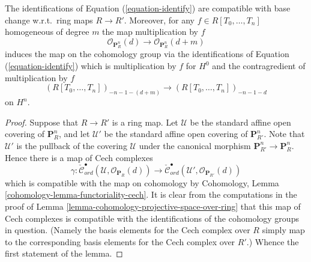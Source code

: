 \begin{lemma}
\label{lemma-identify-functorially}
The identifications of Equation (\ref{equation-identify}) are
compatible with base change w.r.t.\ ring maps $R \to R'$.
Moreover, for any $f \in R[T_0, \ldots, T_n]$ homogeneous
of degree $m$ the map multiplication by $f$
$$
\mathcal{O}_{\mathbf{P}^n_R}(d)
\longrightarrow
\mathcal{O}_{\mathbf{P}^n_R}(d + m)
$$
induces the map on the cohomology group via the identifications
of Equation (\ref{equation-identify}) which is multiplication by
$f$ for $H^0$ and the contragredient of multiplication by $f$
$$
(R[T_0, \ldots, T_n])_{-n - 1 - (d + m)}
\longrightarrow
(R[T_0, \ldots, T_n])_{-n - 1 - d}
$$
on $H^n$.
\end{lemma}

\begin{proof}
Suppose that $R \to R'$ is a ring map.
Let $\mathcal{U}$ be the standard affine open covering of $\mathbf{P}^n_R$,
and let $\mathcal{U}'$ be the standard affine open covering of
$\mathbf{P}^n_{R'}$. Note that $\mathcal{U}'$ is the pullback of the covering
$\mathcal{U}$ under the canonical morphism
$\mathbf{P}^n_{R'} \to \mathbf{P}^n_R$. Hence there
is a map of Cech complexes
$$
\gamma :
\check{\mathcal{C}}_{ord}^\bullet(\mathcal{U},
\mathcal{O}_{\mathbf{P}_R}(d))
\longrightarrow
\check{\mathcal{C}}_{ord}^\bullet(\mathcal{U}',
\mathcal{O}_{\mathbf{P}_{R'}}(d))
$$
which is compatible with the map on cohomology by
Cohomology, Lemma \ref{cohomology-lemma-functoriality-cech}.
It is clear from the computations in the proof of
Lemma \ref{lemma-cohomology-projective-space-over-ring}
that this map of Cech complexes is compatible with the identifications
of the cohomology groups in question. (Namely the basis elements for
the Cech complex over $R$ simply map to the corresponding basis elements
for the Cech complex over $R'$.) Whence the first statement of the lemma.


\end{proof}
